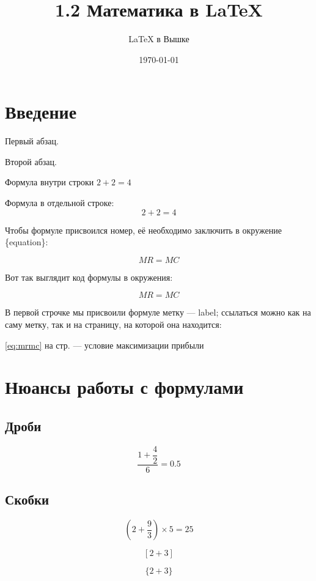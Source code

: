 \documentclass[a4paper,12pt]{article} %
\author{\LaTeX{} в Вышке}
\title{1.2 Математика в \LaTeX}
\date{\today}
\begin{document}

\maketitle

\section{Введение}

Первый            абзац.

Второй абзац.

Формула внутри строки $2 + 2 = 4$

Формула в отдельной строке: $$2 + 2 = 4$$

Чтобы формуле присвоился номер, её необходимо заключить в окружение \{equation\}:

\begin{equation}\label{eq:mrmc}
	MR=MC
\end{equation}

Вот так выглядит код формулы в окружения:
\begin{LTXexample}
\begin{equation}\label{eq:mrmc}
	MR=MC
\end{equation}
\end{LTXexample}

В первой строчке мы присвоили формуле метку --- label; ссылаться можно как на саму метку, так и на страницу, на которой она находится:

\eqref{eq:mrmc} на стр. \pageref{eq:mrmc} --- условие максимизации прибыли

\section{Нюансы работы с формулами}
\subsection{Дроби}

$$\frac{1+\dfrac{4}{2}}{6}=0.5$$

\subsection{Скобки}

$$\left(2+\frac{9}{3}\right)\times5=25$$

$$[2+3]$$

$$\{2+3\}$$
\end{document}
